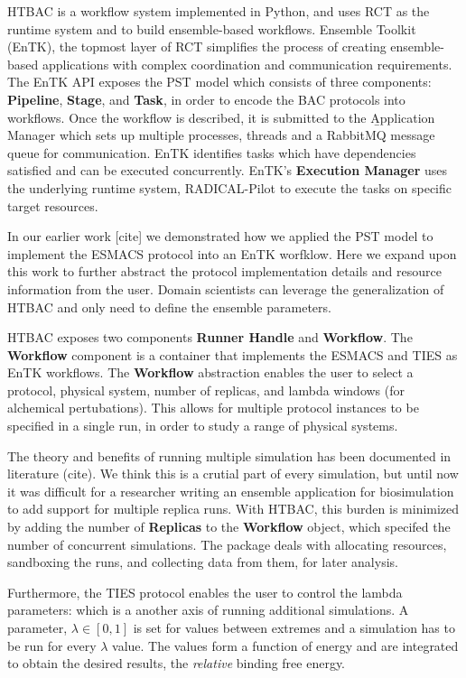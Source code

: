 HTBAC is a workflow system implemented in Python, and uses RCT as the runtime
system and to build ensemble-based workflows. Ensemble Toolkit (EnTK), the
topmost layer of RCT simplifies the process of creating ensemble-based
applications with complex coordination and communication requirements. The
EnTK API exposes the PST model which consists of three components:
\textbf{Pipeline}, \textbf{Stage}, and \textbf{Task}, in order to encode the
BAC protocols into workflows. Once the workflow is described, it is submitted
to the \b{Application Manager} which sets up multiple processes, threads and
a RabbitMQ message queue for communication. EnTK identifies tasks which have
dependencies satisfied and can be executed concurrently. EnTK's
\textbf{Execution Manager} uses the underlying runtime system, RADICAL-Pilot
to execute the tasks on specific target resources.

In our earlier work [cite] we demonstrated how we applied the PST model to
implement the ESMACS protocol into an EnTK worfklow. Here we expand upon this
work to further abstract the protocol implementation details and resource
information from the user. Domain scientists can leverage the generalization
of HTBAC and only need to define the ensemble parameters.

HTBAC exposes two components \textbf{Runner Handle} and \textbf{Workflow}.
The \textbf{Workflow} component is a container that implements the ESMACS and
TIES as EnTK workflows. The \textbf{Workflow} abstraction enables the user to
select a protocol, physical system, number of replicas, and lambda windows
(for alchemical pertubations). This allows for multiple protocol instances to
be specified in a single run, in order to study a range of physical systems.

The theory and benefits of  running multiple simulation has been documented
in literature (cite). We think this is a crutial part of every simulation,
but until now it was difficult for a researcher writing an ensemble
application for biosimulation to add support for multiple replica runs. With
HTBAC, this burden is minimized by adding the number of \textbf{Replicas} to
the \textbf{Workflow} object, which specifed the number of concurrent
simulations. The package deals with allocating resources, sandboxing the
runs, and collecting data from them, for later analysis.

Furthermore, the TIES protocol enables the user to control the lambda
parameters: which is a another axis of running additional simulations. A
parameter, $\lambda \in [0, 1]$ is set for values between extremes and a
simulation has to be run for every $\lambda$ value. The values form a
function of energy and are integrated to obtain the desired results, the
\emph{relative} binding free energy.


